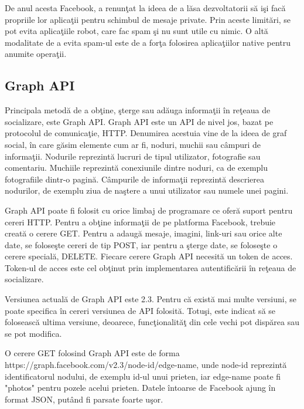 	De anul acesta Facebook, a renun\c{t}at la ideea de a l\u{a}sa dezvoltatorii s\u{a} i\c{s}i fac\u{a} propriile lor aplica\c{t}ii pentru schimbul de mesaje private. Prin aceste limit\u{a}ri, se pot evita aplica\c{t}iile robot, care fac spam \c{s}i nu sunt utile cu nimic. O alt\u{a} modalitate de a evita spam-ul este de a for\c{t}a folosirea aplica\c{t}iilor native pentru anumite opera\c{t}ii.
\subsection{Graph API}
\label{graphapi}
	Principala metod\u{a} de a ob\c{t}ine, \c{s}terge sau ad\u{a}uga informa\c{t}ii \^{i}n re\c{t}eaua de socializare, este Graph API. Graph API este un API de nivel jos, bazat pe protocolul de comunica\c{t}ie, HTTP. Denumirea acestuia vine de la ideea de graf social, \^{i}n care g\u{a}sim elemente cum ar fi, noduri, muchii sau c\^{a}mpuri de informa\c{t}ii. Nodurile reprezint\u{a} lucruri de tipul utilizator, fotografie sau comentariu. Muchiile reprezint\u{a} conexiunile dintre noduri, ca de exemplu fotografiile dintr-o pagin\u{a}. C\^{a}mpurile de informa\c{t}ii reprezint\u{a} descrierea nodurilor, de exemplu ziua de na\c{s}tere a unui utilizator sau numele unei pagini.
	
	Graph API poate fi folosit cu orice limbaj de programare ce ofer\u{a} suport pentru cereri HTTP. Pentru a ob\c{t}ine informa\c{t}ii de pe platforma Facebook, trebuie creat\u{a} o cerere GET. Pentru a adaug\u{a} mesaje, imagini, link-uri sau orice alte date, se folose\c{s}te cereri de tip POST, iar pentru a \c{s}terge date, se folose\c{s}te o cerere special\u{a}, DELETE. Fiecare cerere Graph API necesit\u{a} un token de acces. Token-ul de acces este cel ob\c{t}inut prin implementarea autentific\u{a}rii \^{i}n re\c{t}eaua de socializare.
	
	Versiunea actual\u{a} de Graph API este 2.3. Pentru c\u{a} exist\u{a} mai multe versiuni, se poate specifica \^{i}n cereri versiunea de API folosit\u{a}. Totu\c{s}i, este indicat s\u{a} se foloseasc\u{a} ultima versiune, deoarece, func\c{t}ionalit\u{a}\c{t} din cele vechi pot disp\u{a}rea sau se pot modifica.	

	O cerere GET folosind Graph API este de forma https://graph.facebook.com/v2.3/{node-id}/{edge-name}, unde node-id reprezint\u{a} identificatorul nodului, de exemplu id-ul unui prieten, iar edge-name poate fi "photos" pentru pozele acelui prieten. Datele \^{i}ntoarse de Facebook ajung \^{i}n format JSON, put\^{a}nd fi parsate foarte u\c{s}or.
	
